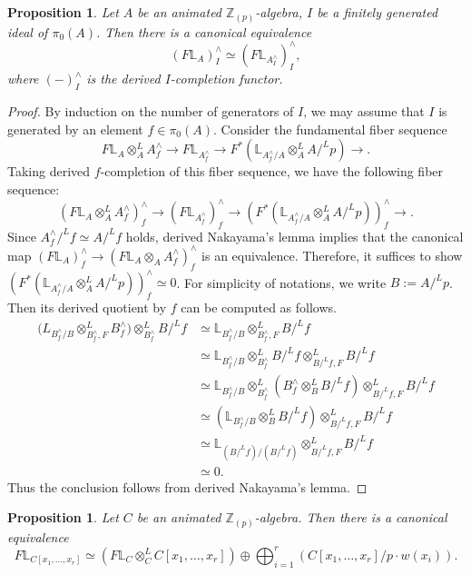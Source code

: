 \documentclass[11pt, a4paper]{amsart}
\theoremstyle{plain}
\newtheorem{prop}[theorem]{Proposition}
\theoremstyle{definition}
\begin{document}
\begin{prop}\label{pro5.11.1}
    Let $A$ be an animated $\mathbb Z_{(p)}$-algebra, $I$ be a finitely generated ideal of $\pi_0(A)$. Then there is a canonical equivalence \[(F\mathbb L_A)_I^{\wedge}\simeq (F\mathbb L_{A_I^{\wedge}})_I^{\wedge},\] where $(-)_I^{\wedge}$ is the derived $I$-completion functor.
\end{prop}
\begin{proof}
    By induction on the number of generators of $I$, we may assume that $I$ is generated by an element $f\in \pi_0(A)$. Consider the fundamental fiber sequence\[F\mathbb L_{A}\otimes^L_{A}A_f^{\wedge}\to  F\mathbb L_{A_{f}^{\wedge}}\to F^*(\mathbb L_{A_f^{\wedge}/A}\otimes_A^LA/^Lp)\to .\] Taking derived $f$-completion of this fiber sequence, we have the following fiber sequence:
    \[(F\mathbb L_{A}\otimes^L_{A}A_f^{\wedge})_f^{\wedge}\to  (F\mathbb L_{A_{f}^{\wedge}})_f^{\wedge}\to (F^*(\mathbb L_{A_f^{\wedge}/A}\otimes_A^LA/^Lp))_f^{\wedge}\to .\]
    Since $A_f^{\wedge}/^Lf\simeq A/^Lf$ holds, derived Nakayama's lemma implies that the canonical map $(F\mathbb L_A)_f^{\wedge}\to (F\mathbb L_A\otimes_AA_f^{\wedge})_f^{\wedge}$ is an equivalence. Therefore, it suffices to show $(F^*(\mathbb L_{A_f^{\wedge}/A}\otimes_A^LA/^Lp))_f^{\wedge}\simeq 0$. For simplicity of notations, we write $B:=A/^Lp$. Then its derived quotient by $f$ can be computed as follows.
    \begin{align*}
        \mathbb (L_{B_f^{\wedge}/B}\otimes^L_{B_f^{\wedge},F}B_f^{\wedge})\otimes^L_{B_f^{\wedge}}B/^Lf&\simeq \mathbb L_{B_f^{\wedge}/B}\otimes^L_{B_f^{\wedge},F}B/^Lf\\
        &\simeq \mathbb L_{B_f^{\wedge}/B}\otimes^L_{B_f^{\wedge}}B/^Lf\otimes^L_{B/^Lf,F}B/^Lf\\
        &\simeq \mathbb L_{B_f^{\wedge}/B}\otimes^L_{B_f^{\wedge}}(B_f^{\wedge}\otimes_B^LB/^Lf)\otimes^L_{B/^Lf,F}B/^Lf\\
        &\simeq (\mathbb L_{B_f^{\wedge}/B}\otimes_B^LB/^Lf)\otimes^L_{B/^Lf,F}B/^Lf\\
        &\simeq \mathbb L_{(B/^Lf)/(B/^Lf)}\otimes^L_{B/^Lf,F}B/^Lf\\
        &\simeq 0.
    \end{align*}
    Thus the conclusion follows from derived Nakayama's lemma.
\end{proof}
\begin{prop}\label{pro5.11.2}
    Let $C$ be an animated $\mathbb Z_{(p)}$-algebra. Then there is a canonical equivalence   \[F\mathbb L_{C[x_1,\dots,x_r]}\simeq (F\mathbb L_C\otimes_C^LC[x_1,\dots,x_r])\oplus \bigoplus_{i=1}^{r}(C[x_1,\dots,x_r]/p\cdot w(x_i)).\]
\end{prop}
\end{document}
